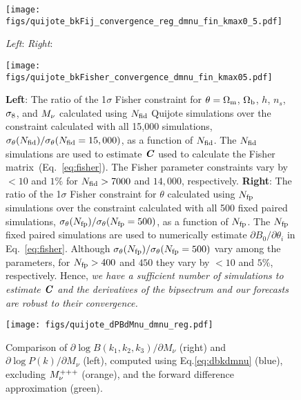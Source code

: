 \begin{figure}
\begin{center}
    \texttt{[image: figs/quijote\_bkFij\_convergence\_reg\_dmnu\_fin\_kmax0\_5.pdf]}
    \caption{{\em Left}: {\em Right}:}
\label{fig:fij_converge}
\end{center}
\end{figure}

\begin{figure}
\begin{center}
    \texttt{[image: figs/quijote\_bkFisher\_convergence\_dmnu\_fin\_kmax05.pdf]}
    \caption{{\bf Left}: The ratio of the 1$\sigma$ Fisher constraint for $\theta=\Omega_{\rm m}$, 
    $\Omega_{\rm b}$, $h$, $n_s$, $\sigma_8$, and $M_\nu$ calculated using $N_{\rm fid}$ Quijote 
    simulations over the constraint calculated with all 15,000 simulations, 
    $\sigma_\theta(N_{\rm fid})/\sigma_\theta(N_{\rm fid} = 15,000)$, as a 
    function of $N_{\rm fid}$. The $N_{\rm fid}$ simulations are used to estimate 
    $\textbf{\textit{C}}$ used to calculate the Fisher matrix~(Eq.~\ref{eq:fisher}). The Fisher
    parameter constraints vary by $<10$ and $1\%$ for $N_{\rm fid} > 7000$ and 
    $14,000$, respectively. 
    {\bf Right}: The ratio of the 1$\sigma$ Fisher constraint for $\theta$ 
    calculated using  $N_{\rm fp}$ simulations over the constraint calculated with 
    all 500 fixed paired simulations, $\sigma_\theta(N_{\rm fp})/\sigma_\theta(N_{\rm fp} = 500)$, 
    as a function of $N_{\rm fp}$. The $N_{\rm fp}$ fixed paired simulations are 
    used to numerically estimate $\partial B_0/\partial \theta_i$ in Eq.~\ref{eq:fisher}. 
    Although $\sigma_\theta(N_{\rm fp})/\sigma_\theta(N_{\rm fp} = 500)$ vary among 
    the parameters, for $N_{\rm fp} > 400$ and $450$ they vary by $< 10$ and $5\%$, 
    respectively. Hence, {\em we have a sufficient number of simulations to estimate 
    $\textbf{\textit{C}}$ and the derivatives of the bipsectrum and our forecasts are robust to 
    their convergence.} 
    }
\label{fig:converge}
\end{center}
\end{figure}

\begin{figure}
\begin{center}
    \texttt{[image: figs/quijote\_dPBdMnu\_dmnu\_reg.pdf]} 
    \caption{Comparison of $\partial \log B(k_1, k_2, k_3)/\partial M_\nu$ (right) 
    and $\partial \log P(k)/\partial M_\nu$ (left), computed using Eq.\ref{eq:dbkdmnu} (blue), 
    excluding $M_\nu^{+++}$ (orange), and the forward difference approximation (green). 
    }
\label{fig:dPBdmnu}
\end{center}
\end{figure}
